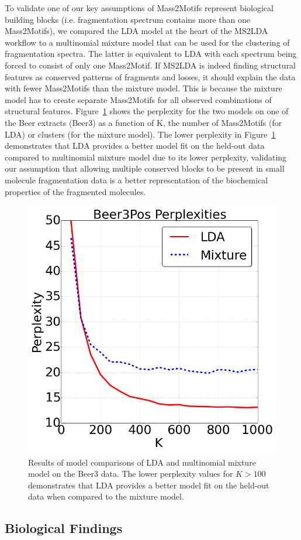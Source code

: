 To validate one of our key assumptions of Mass2Motifs represent biological building blocks (i.e. fragmentation spectrum contains more than one Mass2Motifs), we compared the LDA model at the heart of the MS2LDA workflow to a multinomial mixture model that can be used for the clustering of fragmentation spectra. The latter is equivalent to LDA with each spectrum being forced to consist of only one Mass2Motif. If MS2LDA is indeed finding structural features as conserved patterns of fragments and losses, it should explain the data with fewer Mass2Motifs than the mixture model. This is because the mixture model has to create separate Mass2Motifs for all observed combinations of structural features. Figure~\ref{fig:m2lda-perplexity} shows the perplexity for the two models on one of the Beer extracts (Beer3) as a function of K, the number of Mass2Motifs (for LDA) or clusters (for the mixture model). The lower perplexity in Figure~\ref{fig:m2lda-perplexity} demonstrates that LDA provides a better model fit on the held-out data compared to multinomial mixture model due to its lower perplexity, validating our assumption that allowing multiple conserved blocks to be present in small molecule fragmentation data is a better representation of the biochemical properties of the fragmented molecules. 

\begin{figure}[!htbp]
\centering\includegraphics[width=0.5\linewidth]{07-lda/figures/perplexity.png}
\centering\caption{Results of model comparisons of LDA and multinomial mixture model on the Beer3 data. The lower perplexity values for $K>100$ demonstrates that LDA provides a better model fit on the held-out data when compared to the mixture model.\label{fig:m2lda-perplexity}}
\end{figure}

\subsection{Biological Findings\label{sub:lda-biological-findings}}

